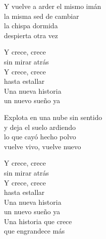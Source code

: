 \begin{lyrics}
Y vuelve a arder el mismo imán\\
la misma sed de cambiar\\
la chispa dormida\\
despierta otra vez

Y crece, crece\\
sin mirar atrás\\
Y crece, crece\\
hasta estallar\\
Una nueva historia\\
un nuevo sueño ya

Explota en una nube sin sentido\\
y deja el suelo ardiendo\\
lo que cayó hecho polvo\\
vuelve vivo, vuelve nuevo

Y crece, crece\\
sin mirar atrás\\
Y crece, crece\\
hasta estallar\\
Una nueva historia\\
un nuevo sueño ya\\
Una historia que crece\\
que engrandece más
\end{lyrics}

